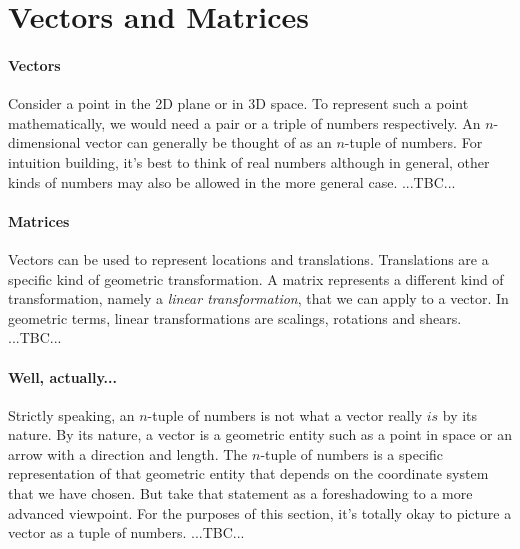 \section{Vectors and Matrices}

\paragraph{Vectors}
Consider a point in the 2D plane or in 3D space. To represent such a point mathematically, we would need a pair or a triple of numbers respectively. An $n$-dimensional vector can generally be thought of as an $n$-tuple of numbers. For intuition building, it's best to think of real numbers although in general, other kinds of numbers may also be allowed in the more general case. ...TBC...




\paragraph{Matrices}
Vectors can be used to represent locations and translations. Translations are a specific kind of geometric transformation. A matrix represents a different kind of transformation, namely a \emph{linear transformation}, that we can apply to a vector. In geometric terms, linear transformations are scalings, rotations and shears. ...TBC...




\paragraph{Well, actually...}
Strictly speaking, an $n$-tuple of numbers is not what a vector really $is$ by its nature. By its nature, a vector is a geometric entity such as a point in space or an arrow with a direction and length. The $n$-tuple of numbers is a specific representation of that geometric entity that depends on the coordinate system that we have chosen. But take that statement as a foreshadowing to a more advanced viewpoint. For the purposes of this section, it's totally okay to picture a vector as a tuple of numbers. ...TBC...

